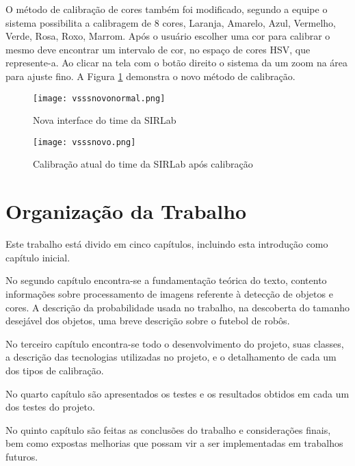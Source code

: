 O método de calibração de cores também foi modificado, segundo a equipe\cite{VSSVision} o sistema possibilita a calibragem de 8 cores, Laranja, Amarelo, Azul, Vermelho, Verde, Rosa, Roxo, Marrom. Após o usuário escolher uma cor para calibrar o mesmo deve encontrar um intervalo de cor, no espaço de cores HSV, que represente-a. Ao clicar na tela com o botão direito o sistema da um zoom na área para ajuste fino. A Figura \ref{SIRLabNovaCalibracao} demonstra o novo método de calibração.
\begin{figure}[H]
\begin{minipage}[H]{0.45\linewidth}
\hspace{0.5cm}
\centering
\texttt{[image: vsssnovonormal.png]}
\caption{Nova interface do time da SIRLab \cite{VSSVision}}
\label{SIRLabNova}
\end{minipage}
\hspace{0.5cm}
\begin{minipage}[H]{0.40\linewidth}
\centering
\texttt{[image: vsssnovo.png]}
\caption{Calibração atual do time da SIRLab \cite{VSSVision} após calibração}
\label{SIRLabNovaCalibracao}
\end{minipage}
\end{figure}	


\section{Organização da Trabalho} \label{Sec:Organizacao}

Este trabalho está divido em cinco capítulos, incluindo esta introdução como capítulo inicial.

No segundo capítulo encontra-se a fundamentação teórica do texto, contento informaç\~oes sobre processamento de imagens referente à detecção de objetos e cores. A descrição da probabilidade usada no trabalho, na descoberta do tamanho desejável dos objetos, uma breve descrição sobre o futebol de robôs. 

No terceiro capítulo encontra-se todo o desenvolvimento do projeto, suas classes, a descrição das tecnologias utilizadas no projeto, e o detalhamento de cada um dos tipos de calibração.

No quarto capítulo são apresentados os testes e os resultados obtidos em cada um dos testes do projeto.

No quinto capítulo são feitas as conclusões do trabalho e considerações finais, bem como expostas melhorias que possam vir a ser implementadas em trabalhos futuros.
